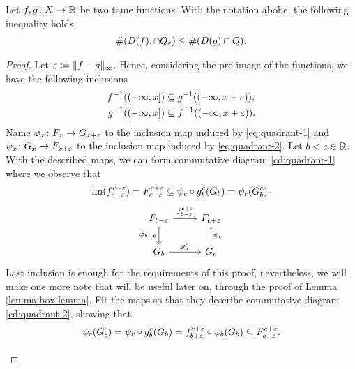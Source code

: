 \begin{lemma} \label{lemma:quadrant-lemma}
    Let $f,g \colon X \to \mathbb R $ be two tame functions. With the notation abobe, the following inequality holds,
    \begin{align}
        \#(D(f), \cap Q_\varepsilon) \leq \#(D(g) \cap Q).
    \end{align}
\end{lemma}
\begin{proof}
    Let $ \varepsilon \coloneq \|f - g\|_\infty $. Hence, considering the pre-image of the functions, we have the following inclusions
    \begin{align}
        f^{-1}((-\infty, x]) &\subseteq g^{-1}((-\infty, x+\varepsilon)), \label{eq:quadrant-1}\\
        g^{-1}((-\infty, x]) &\subseteq f^{-1}((-\infty, x+\varepsilon)). \label{eq:quadrant-2}
    \end{align}
    Name $ \varphi_x \colon F_x \to G_{x+\varepsilon} $  to the inclusion map induced by \eqref{eq:quadrant-1} and $ \psi_x \colon G_x \to F_{x+\varepsilon} $ to the inclusion map induced by \eqref{eq:quadrant-2}. Let $ b<c \in \mathbb R $. With the described maps, we can form commutative diagram \eqref{cd:quadrant-1} where we observe that
    \begin{align} 
        \operatorname{im}(f_{c-\varepsilon}^{c+\varepsilon}) = F_{c-\varepsilon}^{c+\varepsilon} \subseteq \psi_c \circ g_b^c(G_b) = \psi_c (G_b^c).
    \end{align}
    \begin{equation} \label{cd:quadrant-1}
    \begin{tikzcd}
        F_{b-\e} \arrow[r, "f_{b-\e}^{c+\e}"] \arrow[d, "\varphi_{b-\e}"']
        & F_{c+\e} \\
        G_b \arrow[r, "g_b^c"]
        & G_c \arrow[u, "\psi_c"']        
    \end{tikzcd}
    \end{equation}
    Last inclusion is enough for the requirements of this proof, nevertheless, we will make one more note that will be useful later on, through the proof of Lemma \ref{lemma:box-lemma}. Fit the maps so that they describe commutative diagram \eqref{cd:quadrant-2}, showing that
    \begin{align}
        \psi_c(G_b^c) = \psi_c \circ g_b^c(G_b) = f_{b+\varepsilon}^{c+\varepsilon} \circ \psi_b(G_b) \subseteq F_{b+\varepsilon}^{c+\varepsilon}.
    \end{align}
    \begin{equation} \label{cd:quadrant-2}
    \begin{tikzcd}

\end{tikzcd}
\end{equation}
\end{proof}
